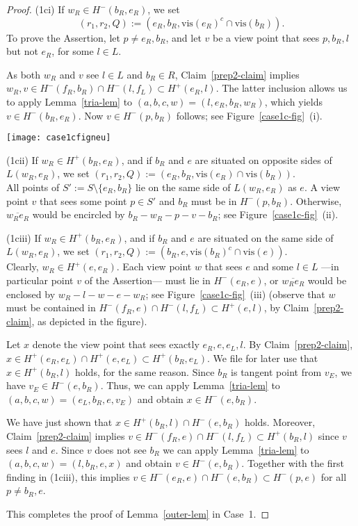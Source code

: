 \documentclass[11pt]{article}
\begin{document}
\begin{proof}
(1ci) If $w_R \in H^-(b_R, e_R)$, we set 
$$(r_1,r_2,Q):=(e_R,b_R,\mbox{vis}(e_R)^c \cap \mbox{vis}(b_R)).$$
To prove the Assertion, let $p \not= e_R, b_R$, and let $v$ be a view point that 
sees $p, b_R, l$ but not $e_R$, for some $l \in L$. 

As both $w_R$ and $v$ see $l \in L$ and $b_R \in R$, 
Claim~\ref{prep2-claim} implies $w_R, v \in H^-(f_R,b_R) \cap H^-(l,f_L) \subset H^+(e_R,l)$.
The latter inclusion allows us to apply Lemma~\ref{tria-lem} to $(a,b,c,w)=(l,e_R,b_R,w_R)$,
which yields $v \in H^-(b_R,e_R)$. Now $v \in H^-(p,b_R)$ follows; 
see Figure~\ref{case1c-fig}~(i).
\begin{figure*}[hbtp]\begin{center}\texttt{[image: case1cfigneu]}\caption{Illustrations of Case 1c.}\label{case1c-fig}
  \end{center}\end{figure*}


(1cii)  If $w_R \in H^+(b_R, e_R)$, and if $b_R$ and $e$ are situated on opposite sides
of $L(w_R,e_R)$, we set  $(r_1,r_2,Q):=(e_R,b_R,\mbox{vis}(e_R) \cap \mbox{vis}(b_R))$.\\
All points of $S':=S\setminus \{e_R,b_R\}$ lie on the same side of $L(w_R,e_R)$ as $e$.
A view point $v$ that sees some point $p \in S'$ and $b_R$ must be in $H^-(p,b_R)$.
Otherwise, $\overline{w_Re_R}$ would be encircled by $b_R-w_R-p-v-b_R$; 
see Figure~\ref{case1c-fig}~(ii).

(1ciii)  If $w_R \in H^+(b_R, e_R)$, and if $b_R$ and $e$ are situated on the same side
of $L(w_R,e_R)$, we set  $(r_1,r_2,Q):=(b_R,e,\mbox{vis}(b_R)^c \cap \mbox{vis}(e))$.\\
Clearly, $w_R \in H^+(e,e_R)$. Each view point $w$ that sees $e$ and some $l \in L$
---in particular point $v$ of the Assertion--- must 
lie in $H^-(e_R, e)$, or $\overline{w_Re_R}$ would be enclosed by $w_R-l-w-e-w_R$;
see Figure~\ref{case1c-fig}~(iii) (observe that $w$ must be contained in 
$H^-(f_R, e) \cap H^-(l,f_L) \subset H^+(e,l)$, 
by Claim~\ref{prep2-claim}, as depicted in the figure).

Let $x$ denote the view point that sees exactly $e_R, e, e_L, l$. By Claim~\ref{prep2-claim},
$x \in H^+(e_R,e_L) \cap H^+(e, e_L) \subset H^+(b_R,e_L)$.
We file for later use that $x \in H^+(b_R,l)$ holds, for the same reason.
Since $b_R$ is tangent point from $v_E$, we have $v_E \in H^-(e,b_R)$. Thus, we
can apply Lemma~\ref{tria-lem} to $(a,b,c,w)=(e_L, b_R, e, v_E)$ and obtain
$x \in H^-(e,b_R)$. 

We have just shown that $x \in H^+(b_R,l) \cap H^-(e,b_R)$ holds. Moreover,
Claim~\ref{prep2-claim} implies $v \in H^-(f_R,e) \cap H^-(l,f_L) \subset H^+(b_R,l)$
since $v$ sees $l$ and $e$. Since $v$ does not see $b_R$ 
we can apply Lemma~\ref{tria-lem} to $(a,b,c,w)=( l,b_R,e,x)$ and obtain $v \in H^-(e, b_R)$.
Together with the first finding in (1ciii), this implies
$v \in H^-(e_R, e) \cap H^-(e, b_R) \subset H^-(p,e)$ for all $p \not= b_R, e$.

This completes the proof of Lemma~\ref{outer-lem} in Case~1.

\end{proof}
\end{document}
